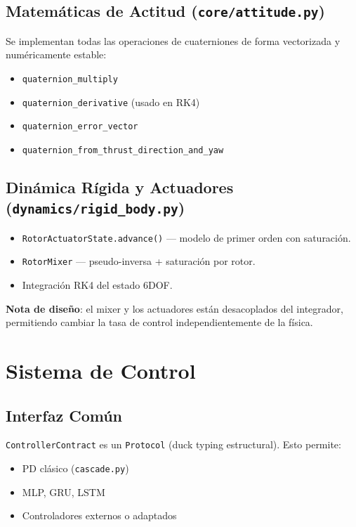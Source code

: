 \documentclass[12pt,a4paper]{article}
\begin{document}
\subsection{Matemáticas de Actitud (\texttt{core/attitude.py})}

Se implementan todas las operaciones de cuaterniones de forma vectorizada y numéricamente estable:

\begin{itemize}
    \item \texttt{quaternion\_multiply}
    \item \texttt{quaternion\_derivative} (usado en RK4)
    \item \texttt{quaternion\_error\_vector}
    \item \texttt{quaternion\_from\_thrust\_direction\_and\_yaw}
\end{itemize}

\subsection{Dinámica Rígida y Actuadores (\texttt{dynamics/rigid\_body.py})}

\begin{itemize}
    \item \texttt{RotorActuatorState.advance()} --- modelo de primer orden con saturación.
    \item \texttt{RotorMixer} --- pseudo-inversa + saturación por rotor.
    \item Integración RK4 del estado 6DOF.
\end{itemize}

\textbf{Nota de diseño}: el mixer y los actuadores están desacoplados del integrador, permitiendo cambiar la tasa de control independientemente de la física.

\section{Sistema de Control}

\subsection{Interfaz Común}

\texttt{ControllerContract} es un \texttt{Protocol} (duck typing estructural). Esto permite:

\begin{itemize}
    \item PD clásico (\texttt{cascade.py})
    \item MLP, GRU, LSTM
    \item Controladores externos o adaptados
\end{itemize}
\end{document}
